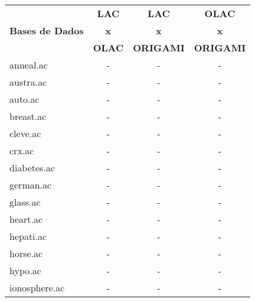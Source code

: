 \begin{table}[htbp]
	\centering
		\renewcommand{\tabcolsep}{1.8mm}
		\begin{tabular}{|l|c|c|c|}
		\hline
					& \textbf{LAC}		& \textbf{LAC}		& \textbf{OLAC}		\\
		\textbf{Bases de Dados}	& \textbf{x}		& \textbf{x}		& \textbf{x}		\\
					& \textbf{OLAC}		& \textbf{ORIGAMI}	& \textbf{ORIGAMI}	\\
		\hline
		anneal.ac               & -                     & -                     & -                     \\
		\hline
		austra.ac               & -                     & -                     & -                     \\
		\hline
		auto.ac                 & -                     & -                     & -                     \\
		\hline
		breast.ac               & -                     & -                     & -                     \\
		\hline
		cleve.ac                & -                     & -                     & -                     \\
		\hline
		crx.ac                  & -                     & -                     & -                     \\
		\hline
		diabetes.ac             & -                     & -                     & -                     \\
		\hline
		german.ac               & -                     & -                     & -                     \\
		\hline
		glass.ac                & -                     & -                     & -                     \\
		\hline
		heart.ac                & -                     & -                     & -                     \\
		\hline
		hepati.ac               & -                     & -                     & -                     \\
		\hline
		horse.ac                & -                     & -                     & -                     \\
		\hline
		hypo.ac                 & -                     & -                     & -                     \\
		\hline
		ionosphere.ac           & -                     & -                     & -                     \\
		\hline

\end{tabular}
\end{table}
